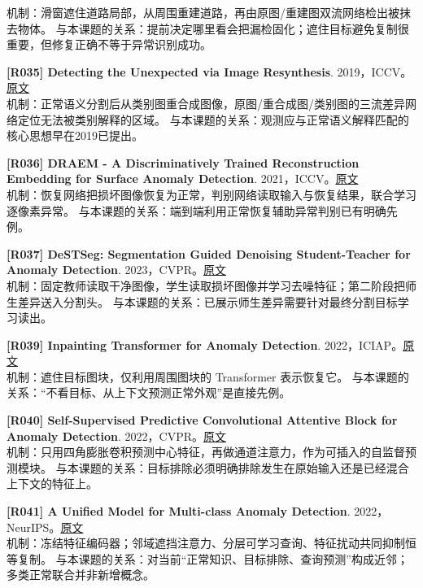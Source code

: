 \documentclass[11pt,a4paper]{article}
\begin{document}
机制：滑窗遮住道路局部，从周围重建道路，再由原图/重建图双流网络检出被抹去物体。 与本课题的关系：提前决定哪里看会把漏检固化；遮住目标避免复制很重要，但修复正确不等于异常识别成功。\par\medskip
\hypertarget{R035}{}\textbf{[R035] Detecting the Unexpected via Image Resynthesis}. 2019，ICCV。\href{https://arxiv.org/html/1904.07595}{原文}\\
机制：正常语义分割后从类别图重合成图像，原图/重合成图/类别图的三流差异网络定位无法被类别解释的区域。 与本课题的关系：观测应与正常语义解释匹配的核心思想早在2019已提出。\par\medskip
\hypertarget{R036}{}\textbf{[R036] DRAEM - A Discriminatively Trained Reconstruction Embedding for Surface Anomaly Detection}. 2021，ICCV。\href{https://arxiv.org/pdf/2108.07610}{原文}\\
机制：恢复网络把损坏图像恢复为正常，判别网络读取输入与恢复结果，联合学习逐像素异常。 与本课题的关系：端到端利用正常恢复辅助异常判别已有明确先例。\par\medskip
\hypertarget{R037}{}\textbf{[R037] DeSTSeg: Segmentation Guided Denoising Student-Teacher for Anomaly Detection}. 2023，CVPR。\href{https://arxiv.org/pdf/2211.11317}{原文}\\
机制：固定教师读取干净图像，学生读取损坏图像并学习去噪特征；第二阶段把师生差异送入分割头。 与本课题的关系：已展示师生差异需要针对最终分割目标学习读出。\par\medskip
\hypertarget{R039}{}\textbf{[R039] Inpainting Transformer for Anomaly Detection}. 2022，ICIAP。\href{https://arxiv.org/pdf/2104.13897}{原文}\\
机制：遮住目标图块，仅利用周围图块的 Transformer 表示恢复它。 与本课题的关系：“不看目标、从上下文预测正常外观”是直接先例。\par\medskip
\hypertarget{R040}{}\textbf{[R040] Self-Supervised Predictive Convolutional Attentive Block for Anomaly Detection}. 2022，CVPR。\href{https://openaccess.thecvf.com/content/CVPR2022/papers/Ristea_Self-Supervised_Predictive_Convolutional_Attentive_Block_for_Anomaly_Detection_CVPR_2022_paper.pdf}{原文}\\
机制：只用四角膨胀卷积预测中心特征，再做通道注意力，作为可插入的自监督预测模块。 与本课题的关系：目标排除必须明确排除发生在原始输入还是已经混合上下文的特征上。\par\medskip
\hypertarget{R041}{}\textbf{[R041] A Unified Model for Multi-class Anomaly Detection}. 2022，NeurIPS。\href{https://arxiv.org/pdf/2206.03687}{原文}\\
机制：冻结特征编码器；邻域遮挡注意力、分层可学习查询、特征扰动共同抑制恒等复制。 与本课题的关系：对当前“正常知识、目标排除、查询预测”构成近邻；多类正常联合并非新增概念。\par\medskip
\end{document}
